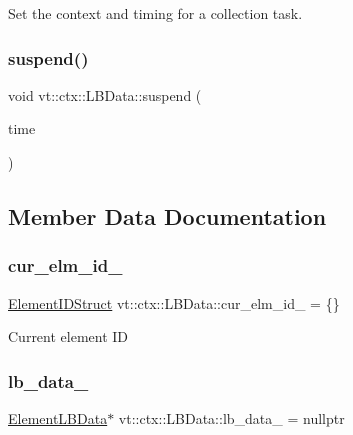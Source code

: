 Set the context and timing for a collection task. 

\mbox{\label{structvt_1_1ctx_1_1_l_b_data_accc285604c55529bfbd04ad244a5722e}} 
\subsubsection{\texorpdfstring{suspend()}{suspend()}}
{\footnotesize\ttfamily void vt\+::ctx\+::\+L\+B\+Data\+::suspend (\begin{DoxyParamCaption}\item[{\hyperlink{namespacevt_a876a9d0cd5a952859c72de8a46881442}{Time\+Type}}]{time }\end{DoxyParamCaption})}



\subsection{Member Data Documentation}
\mbox{\label{structvt_1_1ctx_1_1_l_b_data_a8d84887a884c7f5783d4ccd7e5effd92}} 
\subsubsection{\texorpdfstring{cur\+\_\+elm\+\_\+id\+\_\+}{cur\_elm\_id\_}}
{\footnotesize\ttfamily \hyperlink{structvt_1_1ctx_1_1_l_b_data_aad9fac05c3faf80173b273d900db6fb1}{Element\+I\+D\+Struct} vt\+::ctx\+::\+L\+B\+Data\+::cur\+\_\+elm\+\_\+id\+\_\+ = \{\}\hspace{0.3cm}{\ttfamily [private]}}

Current element ID \mbox{\label{structvt_1_1ctx_1_1_l_b_data_a766b2b0aa69889fc3e397c7bfbb0b68a}} 
\subsubsection{\texorpdfstring{lb\+\_\+data\+\_\+}{lb\_data\_}}
{\footnotesize\ttfamily \hyperlink{structvt_1_1ctx_1_1_l_b_data_a11f1aeb75c01ae0c77d96f94ce1994bb}{Element\+L\+B\+Data}$\ast$ vt\+::ctx\+::\+L\+B\+Data\+::lb\+\_\+data\+\_\+ = nullptr\hspace{0.3cm}{\ttfamily [private]}}

